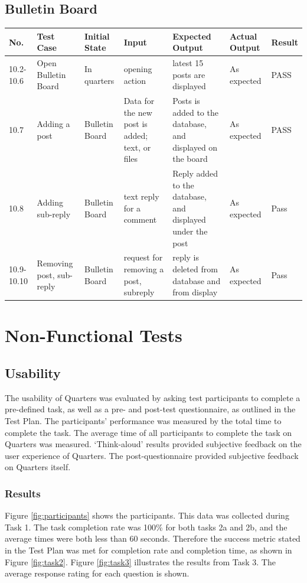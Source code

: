 \documentclass[12pt]{article}
\begin{document}
\subsection{Bulletin Board}
\begin{longtable}{|p{1.5cm}|p{1.5cm}|p{1.5cm}|p{2cm}|p{4cm}|p{2cm}|p{1.5cm}|}
\hline
\textbf{No.} & \textbf{Test Case}  & \textbf{Initial State} & \textbf{Input} & \textbf{Expected Output} & \textbf{Actual Output} & \textbf{Result}\\ 
\hline
10.2-10.6 & Open Bulletin Board & In quarters& opening action & latest 15 posts are displayed & As expected & PASS\\
\hline
10.7 & Adding a post & Bulletin Board & Data for the new post is added; text, or files & Posts is added to the database, and displayed on the board&As expected & PASS\\
\hline
10.8 & Adding sub-reply & Bulletin Board & text reply for a comment&Reply added to the database, and displayed under the post&As expected&Pass\\
\hline
10.9-10.10 & Removing post, sub-reply & Bulletin Board & request for removing a post, subreply & reply is deleted from database and from display & As expected & Pass\\
\hline
\end{longtable}


\section{Non-Functional Tests}

\subsection{Usability}
The usability of Quarters was evaluated by asking test participants to complete a pre-defined task, as well as a pre- and post-test questionnaire, as outlined in the Test Plan. The participants' performance was measured by the total time to complete the task. The average time of all participants to complete the task on Quarters was measured. ‘Think-aloud’ results provided subjective feedback on the user experience of Quarters. The post-questionnaire provided subjective feedback on Quarters itself.

\subsubsection{Results}
Figure \ref{fig:participants} shows the participants. This data was collected during Task 1. The task completion rate was 100\% for both tasks 2a and 2b, and the average times were both less than 60 seconds. Therefore the success metric stated in the Test Plan was met for completion rate and completion time, as shown in Figure \ref{fig:task2}. Figure \ref{fig:task3} illustrates the results from Task 3. The average response rating for each question is shown.
\end{document}
